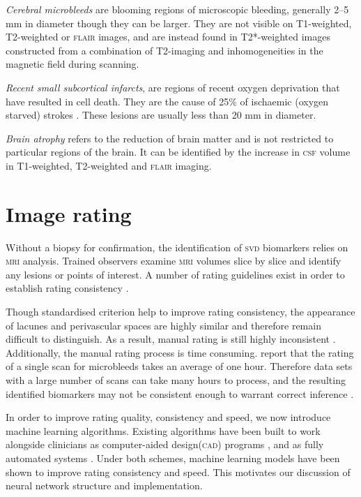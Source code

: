 \textit{Cerebral microbleeds} are blooming regions of microscopic bleeding, generally 2--5 mm in diameter though they can be larger. They are not visible on T1-weighted, T2-weighted or \textsc{flair} images, and are instead found in T2*-weighted images constructed from a combination of T2-imaging and inhomogeneities in the magnetic field during scanning. 

\textit{Recent small subcortical infarcts}, are regions of recent oxygen deprivation that have resulted in cell death. They are the cause of 25\% of ischaemic (oxygen starved) strokes \citep{WardlawJ.M.2013Nsfr}. These lesions are usually less than 20 mm in diameter. 

\textit{Brain atrophy} refers to the reduction of brain matter and is not restricted to particular regions of the brain. It can be identified by the increase in \textsc{csf} volume in T1-weighted, T2-weighted and \textsc{flair} imaging.

\section{Image rating}\label{svd-rating}

Without a biopsy for confirmation, the identification of \textsc{svd} biomarkers relies on \textsc{mri} analysis. Trained observers examine \textsc{mri} volumes slice by slice and identify any lesions or points of interest. A number of rating guidelines exist in order to establish rating consistency \citep{AdamsH.H.Hieab2013RMfD, PotterGillian2015CPSV, WardlawJ.M.2013Nsfr}.

Though standardised criterion help to improve rating consistency, the appearance of lacunes and perivascular spaces are highly similar and therefore remain difficult to distinguish. As a result, manual rating is still highly inconsistent \citep{PotterGillian2015CPSV}. Additionally, the manual rating process is time consuming. \cite{Heuvel2016} report that the rating of a single scan for microbleeds takes an average of one hour. Therefore data sets with a large number of scans can take many hours to process, and the resulting identified biomarkers may not be consistent enough to warrant correct inference \citep{BenjaminJ.Philip2018LIbN, WardlawJ.M.2013Nsfr}.

In order to improve rating quality, consistency and speed, we now introduce machine learning algorithms. Existing algorithms have been built to work alongside clinicians as computer-aided design(\textsc{cad}) programs \citep{Heuvel2016, Uchiyama20071554, Yokoyama2007}, and as fully automated systems \citep{DouQ.2016ADoC, GhafoorianM.2017Dml3}. Under both schemes, machine learning models have been shown to improve rating consistency and speed. This motivates our discussion of neural network structure and implementation.



